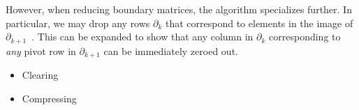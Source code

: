 However, when reducing boundary matrices, the algorithm specializes further. In particular, we may drop any rows $\partial_k$ that correspond to elements in the image of $\partial_{k+1}$~\cite{elz-tps-02,zc-cph-05}. This can be expanded to show that any column in $\partial_k$ corresponding to \emph{any} pivot row in $\partial_{k+1}$ can be immediately zeroed out.
\begin{itemize}
\item Clearing
\item Compressing
\end{itemize}
%
